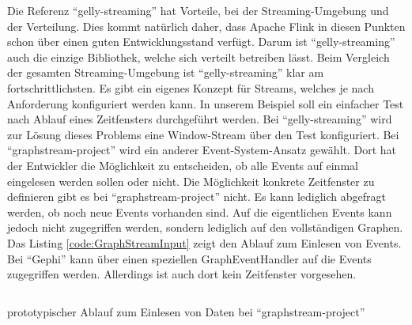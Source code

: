 Die Referenz \enquote{gelly-streaming} hat Vorteile, bei der Streaming-Umgebung
und der Verteilung. Dies kommt natürlich daher, dass Apache Flink in diesen
Punkten schon über einen guten Entwicklungsstand verfügt. Darum ist
\enquote{gelly-streaming} auch die einzige Bibliothek, welche sich verteilt
betreiben lässt. Beim Vergleich der gesamten Streaming-Umgebung ist
\enquote{gelly-streaming} klar am fortschrittlichsten. Es gibt ein eigenes
Konzept für Streams, welches je nach Anforderung konfiguriert werden kann. In
unserem Beispiel soll ein einfacher Test nach Ablauf eines Zeitfensters
durchgeführt werden. Bei \enquote{gelly-streaming} wird zur Lösung dieses
Problems eine Window-Stream über den Test konfiguriert. Bei \enquote{graphstream-project}
wird ein anderer Event-System-Ansatz gewählt. Dort hat der Entwickler die
Möglichkeit zu entscheiden, ob alle Events auf einmal eingelesen werden sollen
oder nicht. Die Möglichkeit konkrete Zeitfenster zu definieren gibt es bei
\enquote{graphstream-project} nicht. Es kann lediglich abgefragt werden, ob noch
neue Events vorhanden sind. Auf die eigentlichen Events kann jedoch nicht
zugegriffen werden, sondern lediglich auf den vollständigen Graphen. Das Listing
\ref{code:GraphStreamInput} zeigt den Ablauf zum Einlesen von Events. Bei \enquote{Gephi}
kann über einen speziellen GraphEventHandler auf die Events zugegriffen werden.
Allerdings ist auch dort kein Zeitfenster vorgesehen.

\begin{listing}
\inputminted[breaklines=true]{java}{../material/code/GraphStreamInput.java}
\caption{prototypischer Ablauf zum Einlesen von Daten bei \enquote{graphstream-project}}
\label{code:GraphStreamInput}
\end{listing}

